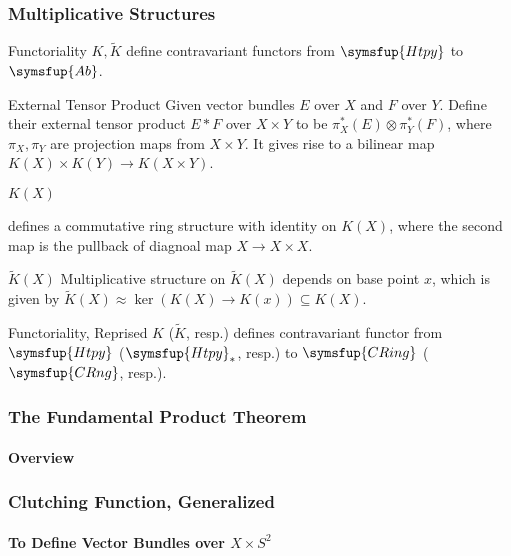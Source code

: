 \documentclass[noamsthm]{beamer}
\newcommand\iso{\approx}
\newcommand\rk{\tilde{K}}
\newcommand\cat[1]{\symsfup{#1}}
\begin{document}
  \begin{frame}
    \frametitle{Multiplicative Structures}
    \begin{block}{Functoriality}
      $K, \rk$ define contravariant functors from $\cat{Htpy}$ to $\cat{Ab}$.
    \end{block}
    \begin{block}{External Tensor Product}
      Given vector bundles $E$ over $X$ and $F$ over $Y$. Define their external tensor product $E*F$ over $X\times Y$ to be $\pi_{X}^*(E)\otimes\pi_{Y}^*(F)$, where $\pi_X, \pi_Y$ are projection maps from $X\times Y$. It gives rise to a bilinear map $K(X)\times K(Y)\to K(X\times Y)$.
    \end{block}
    \begin{block}{$K(X)$}
      defines a commutative ring structure with identity on $K(X)$, where the second map is the pullback of diagnoal map $X\to X\times X$.
    \end{block}
    \begin{block}{$\rk(X)$}
      Multiplicative structure on $\rk(X)$ depends on base point $x$, which is given by $\rk(X)\iso \ker(K(X)\to K(x))\subseteq K(X)$.
    \end{block}
    \begin{block}{Functoriality, Reprised}
      $K$ ($\rk$, resp.) defines contravariant functor from $\cat{Htpy}$ ($\cat{Htpy}_*$, resp.) to $\cat{CRing}$ ($\cat{CRng}$, resp.).
    \end{block}
  \end{frame}
  \begin{frame}
    \frametitle{The Fundamental Product Theorem}
    \framesubtitle{Overview}
  \end{frame}
  \begin{frame}
    \frametitle{Clutching Function, Generalized}
    \framesubtitle{To Define Vector Bundles over $X\times S^2$}
  \end{frame}
\end{document}
